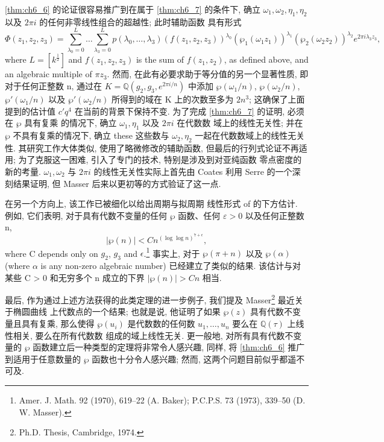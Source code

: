 \autoref{thm:ch6_6} 的论证很容易推广到在属于 \autoref{thm:ch6_7} 的条件下, 确立 $\omega_1, \omega_2, \eta_1, \eta_2$ 以及 $2\pi i$ 的任何非零线性组合的超越性; 此时辅助函数 具有形式
\[ \Phi(z_1,z_2,z_3) = \sum_{\lambda_0=0}^L \dots \sum_{\lambda_3=0}^L p(\lambda_0,\dots,\lambda_3) (f(z_1,z_2,z_3))^{\lambda_0} (\wp_1(\omega_1z_1))^{\lambda_1} (\wp_2(\omega_2z_2))^{\lambda_2} e^{2\pi i \lambda_3 z_3}, \]
where $L = [k^{\frac{1}{2}}]$ and $f(z_1, z_2, z_3)$ is the sum of $f(z_1, z_2)$, as defined above, and an algebraic multiple of $\pi z_3$. 然而, 在此有必要求助于等分值的另一个显著性质, 即对于任何正整数 n, 通过在 $K = \mathbb{Q}(g_2, g_3, e^{2\pi i/n})$ 中添加 $\wp(\omega_1/n)$, $\wp(\omega_2/n)$, $\wp'(\omega_1/n)$ 以及 $\wp'(\omega_2/n)$ 所得到的域在 K 上的次数至多为 $2n^3$; 这确保了上面提到的估计值 $c'q^4$ 在当前的背景下保持不变. 为了完成 \autoref{thm:ch6_7} 的证明, 必须在 $\wp$ 具有复乘 的情况下, 确立 $\omega_1, \eta_1$ 以及 $2\pi i$ 在代数数 域上的线性无关性; 并在 $\wp$ 不具有复乘的情况下, 确立 these 这些数与 $\omega_2, \eta_2$ 一起在代数数域上的线性无关性. 其研究工作大体类似, 使用了略微修改的辅助函数, 但最后的行列式论证不再适用; 为了克服这一困难, 引入了专门的技术, 特别是涉及到对亚纯函数 零点密度的新的考量. $\omega_1, \omega_2$ 与 $2\pi i$ 的线性无关性实际上首先由 Coates 利用 Serre 的一个深刻结果证明, 但 Masser 后来以更初等的方式验证了这一点.

在另一个方向上, 该工作已被细化以给出周期与拟周期 线性形式 of 的下方估计. 例如, 它们表明, 对于具有代数不变量的任何 $\wp$ 函数、任何 $\varepsilon > 0$ 以及任何正整数 n,
\[|\wp(n)| < C n^{(\log \log n)^{7+\epsilon}},\]
where C depends only on $g_2$, $g_3$ and $\epsilon$.\footnote{Amer. J. Math. 92 (1970), 619--22 (A. Baker); P.C.P.S. 73 (1973), 339--50 (D. W. Masser).} 事实上, 对于 $\wp(\pi+n)$ 以及 $\wp(\alpha)$ (where $\alpha$ is any non-zero algebraic number) 已经建立了类似的结果. 该估计与对某些 C > 0 和无穷多个 n 成立的下界 $|\wp(n)| > Cn$ 相当.

最后, 作为通过上述方法获得的此类定理的进一步例子, 我们提及 Masser\footnote{Ph.D. Thesis, Cambridge, 1974.} 最近关于椭圆曲线 上代数点的一个结果; 也就是说, 他证明了如果 $\wp(z)$ 具有代数不变量且具有复乘, 那么使得 $\wp(u_i)$ 是代数数的任何数 $u_1, \ldots, u_n$ 要么在 $\mathbb{Q}(\tau)$ 上线性相关, 要么在所有代数数 组成的域上线性无关. 更一般地, 对所有具有代数不变量的 $\wp$ 函数建立后一种类型的定理将非常令人感兴趣, 同样, 将 \autoref{thm:ch6_6} 推广到适用于任意数量的 $\wp$ 函数也十分令人感兴趣; 然而, 这两个问题目前似乎都遥不可及.
